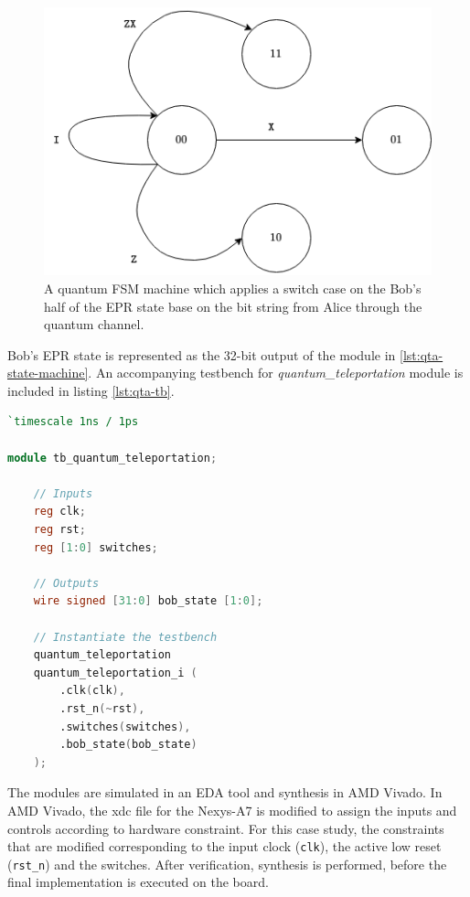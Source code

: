 \begin{figure}[!ht]
	\centering
	\includegraphics[width=0.65\linewidth]{body/ch5/figs/qta-fsm}
	\caption[The Quantum Finite State Machine for Emulating the Quantum Teleportation Algorithm on the FPGA.]{A quantum FSM machine which applies a switch case on the Bob's half of the EPR state base on the bit string from Alice through the quantum channel. }
	\label{fig:qta-fsm}
\end{figure}

Bob's EPR state is represented as the 32-bit output of the module in \ref{lst:qta-state-machine}. An accompanying testbench for \textit{quantum\_teleportation} module is included in listing \ref{lst:qta-tb}.
\begin{lstlisting}[language=Verilog, caption={Code snippet of the testbench for the quantum teleportation algorithm module.}, label={lst:qta-tb}]
`timescale 1ns / 1ps

module tb_quantum_teleportation;

	// Inputs
	reg clk;
	reg rst;
	reg [1:0] switches;
	
	// Outputs
	wire signed [31:0] bob_state [1:0];
	
	// Instantiate the testbench
	quantum_teleportation
	quantum_teleportation_i (
		.clk(clk),
		.rst_n(~rst),
		.switches(switches),
		.bob_state(bob_state)
	);
\end{lstlisting}
The modules are simulated in an EDA tool and synthesis in AMD Vivado. In AMD Vivado, the xdc file for the Nexys-A7 is modified to assign the inputs and controls according to hardware constraint. For this case study, the constraints that are modified corresponding to the input clock (\texttt{clk}), the active low reset (\texttt{rst\_n}) and the switches. After verification, synthesis is performed, before the final implementation is executed on the board.

